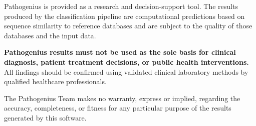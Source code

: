 \documentclass[12pt,a4paper]{report}
\begin{document}
Pathogenius is provided as a research and decision-support tool. The results produced by the classification pipeline are computational predictions based on sequence similarity to reference databases and are subject to the quality of those databases and the input data.

\textbf{Pathogenius results must not be used as the sole basis for clinical diagnosis, patient treatment decisions, or public health interventions.} All findings should be confirmed using validated clinical laboratory methods by qualified healthcare professionals.

The Pathogenius Team makes no warranty, express or implied, regarding the accuracy, completeness, or fitness for any particular purpose of the results generated by this software.
\end{document}
